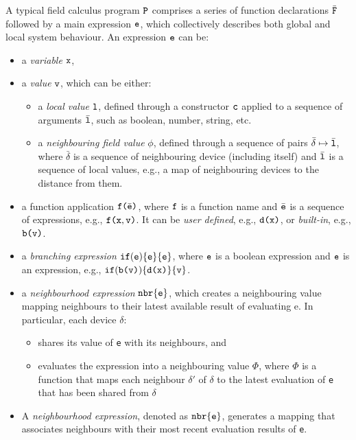 A typical field calculus program $\texttt{P}$ comprises a series of function declarations $\bar{\texttt{F}}$ followed by a main expression $\texttt{e}$, 
 which collectively describes both global and local system behaviour. 
An expression $\texttt{e}$ can be:
\begin{itemize}
    \item a \emph{variable} $\texttt{x}$,
    \item a \emph{value} $\texttt{v}$, which can be either:
    \begin{itemize}
        \item a \emph{local value} $\texttt{l}$, defined through a constructor $\texttt{c}$ applied to a sequence of arguments $\bar{\texttt{l}}$, such as boolean, number, string, etc.
        \item a \emph{neighbouring field value} $\phi$, defined through a sequence of pairs $\bar{\delta} \mapsto \bar{\texttt{l}}$, where $\bar{\delta}$ is a sequence of neighbouring device (including itself) and $\bar{\texttt{l}}$ is a sequence of local values, e.g., a map of neighbouring devices to the distance from them.
    \end{itemize}
    \item a function application $\texttt{f(}\bar{\texttt{e}}\texttt{)}$, where $\texttt{f}$ is a function name and $\bar{\texttt{e}}$ is a sequence of expressions, e.g., $\texttt{f(}\texttt{x}, \texttt{v}\texttt{)}$. 
    It can be \emph{user defined}, e.g., $\texttt{d(}\texttt{x}\texttt{)}$, or \emph{built-in}, e.g., $\texttt{b(}\texttt{v}\texttt{)}$.
    \item a \emph{branching expression} $\texttt{if}(\texttt{e})\{\texttt{e}\}\{\texttt{e}\}$, where $\texttt{e}$ is a boolean expression and $\texttt{e}$ is an expression, e.g., $\texttt{if}(\texttt{b(}\texttt{v}\texttt{)})\{\texttt{d(}\texttt{x}\texttt{)}\}\{\texttt{v}\}$. 
    \item a \emph{neighbourhood expression} $\texttt{nbr}\{\texttt{e}\}$, which creates a neighbouring value mapping neighbours to their latest available result of evaluating e. In particular, each
    device $\delta$:
    \begin{itemize}
        \item shares its value of \texttt{e} with its neighbours, and
        \item evaluates the expression into a neighbouring value $\Phi$, where $\Phi$ is a function that maps each neighbour $\delta'$ of $\delta$ to the latest evaluation of \texttt{e} that
        has been shared from $\delta$
    \end{itemize}
    \item A \emph{neighbourhood expression}, denoted as $\texttt{nbr}\{\texttt{e}\}$, 
     generates a mapping that associates neighbours with their most recent evaluation results of \texttt{e}. 

\end{itemize}
